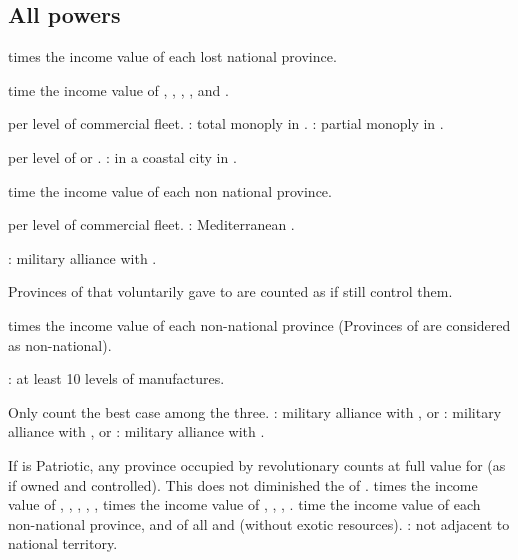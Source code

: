 \subsection{All powers}
 times the income value of each lost national province.

\aparag[Territory.]
 time the income value of ,
, , ,
and .

\aparag[Trade.]
 \VP per level of commercial fleet.
 \VPs: total monoply in .
 \VPs: partial monoply in .

\aparag[Colonisation.]
 \VP per level of \COL or \TP.
 \VPs: \COL in a coastal city in .%

\aparag[Territory.]
 time the income value of each non national province.

\aparag[Trade.]
 \VP per level of commercial fleet.
 \VPs: Mediterranean .

\aparag[Military.]
 \VPs: military alliance with .

 Provinces of  that  voluntarily gave to
 are counted as if  still
control them.

\aparag[Territory.]
 times the income value of each non-national province
(Provinces of  are considered as non-national).

\aparag[Industry.]
 \VPs: at least 10 levels of manufactures.

\aparag[Military.] Only count the best case among the three.
 \VPs: military alliance with , or
 \VPs: military alliance with , or
 \VPs: military alliance with .

\aparag[Territory.]
\bparag If \HOL is Patriotic, any province occupied by revolutionary
\FRA counts at full value for \HOL (as if owned and controlled). This
does not diminished the \VPs of \FRA.
 times the income value of ,
, , ,
, 
 times the income value of ,
, , .
 time the income value of each non-national province, and of
all \COL and \TP (without exotic resources).
 \VPs: \FRA not adjacent to national territory.


